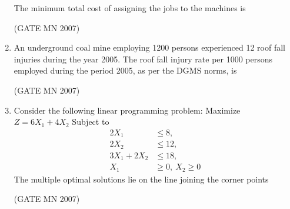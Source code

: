 \documentclass[journal]{IEEEtran}
\begin{document}
\begin{enumerate}
The minimum total cost of assigning the jobs to the machines is  
\begin{enumerate}
\end{enumerate}

\hfill (GATE MN 2007)

\item An underground coal mine employing 1200 persons experienced 12 roof fall injuries during the year 2005. The roof fall injury rate per 1000 persons employed during the period 2005, as per the DGMS norms, is  
\begin{enumerate}
\end{enumerate}

\hfill (GATE MN 2007)

\item Consider the following linear programming problem:  
Maximize $Z = 6X_1 + 4X_2$  
Subject to
\[
\begin{aligned}
2X_1 &\le 8, \\
2X_2 &\le 12, \\
3X_1 + 2X_2 &\le 18, \\
X_1 &\ge 0, \ X_2 \ge 0
\end{aligned}
\]
The multiple optimal solutions lie on the line joining the corner points  
\begin{enumerate}

\end{enumerate}

\hfill (GATE MN 2007)


\end{enumerate}
\end{document}
